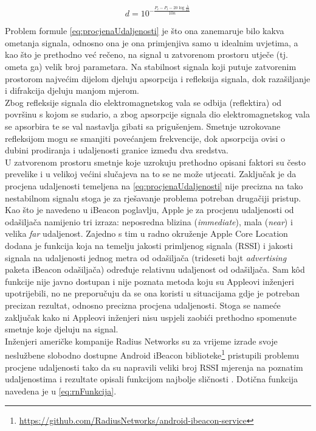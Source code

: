 \begin{equation}
	\label{eq:procjenaUdaljenosti}
	d = 10^{-\frac{P_r - P_t - 20\log{\frac{\lambda}{4\pi}}}{10n}}
\end{equation}

Problem formule \eqref{eq:procjenaUdaljenosti} je što ona zanemaruje bilo kakva ometanja signala, odnosno ona je ona primjenjiva samo u idealnim uvjetima, a kao što je prethodno već rečeno, na signal u zatvorenom prostoru utječe (tj. ometa ga) velik broj parametara. 
Na stabilnost signala koji putuje zatvorenim prostorom najvećim dijelom djeluju apsorpcija i refleksija signala, dok razašiljanje i difrakcija djeluju manjom mjerom.
\\
Zbog refleksije signala dio elektromagnetskog vala se odbija (reflektira) od površinu s kojom se sudario, a zbog apsorpcije signala dio elektromagnetskog vala se apsorbira te se val nastavlja gibati sa prigušenjem. 
Smetnje uzrokovane refleksijom mogu se smanjiti povećanjem frekvencije, dok apsorpcija ovisi o dubini prodiranja i udaljenosti granice između dva sredstva. 
\\

U zatvorenom prostoru smetnje koje uzrokuju prethodno opisani faktori su često prevelike i u velikoj većini slučajeva na to se ne može utjecati. 
Zaključak je da procjena udaljenosti temeljena na \eqref{eq:procjenaUdaljenosti} nije precizna na tako nestabilnom signalu stoga je za rješavanje problema potreban drugačiji pristup.
\\

Kao što je navedeno u iBeacon poglavlju, Apple je za procjenu udaljenosti od odašiljača namijenio tri izraza: neposredna blizina (\textit{immediate}), mala (\textit{near}) i velika \textit{far} udaljenost.
Zajedno s tim u radno okruženje Apple Core Location dodana je funkcija koja na temelju jakosti primljenog signala (RSSI) i jakosti signala na udaljenosti jednog metra od odašiljača (trideseti bajt \textit{advertising} paketa iBeacon odašiljača) određuje relativnu udaljenost od odašiljača. 
Sam kôd funkcije nije javno dostupan i nije poznata metoda koju su Appleovi inženjeri upotrijebili, no ne preporučuju da se ona koristi u situacijama gdje je potreban precizan rezultat, odnosno precizna procjena udaljenosti. 
Stoga se nameće zaključak kako ni Appleovi inženjeri nisu uspjeli zaobići prethodno spomenute smetnje koje djeluju na signal.
\\

Inženjeri američke kompanije Radius Networks su za vrijeme izrade svoje neslužbene slobodno dostupne Android iBeacon biblioteke\footnote{\url{https://github.com/RadiusNetworks/android-ibeacon-service}} pristupili problemu procjene udaljenosti tako da su napravili veliki broj RSSI mjerenja na poznatim udaljenostima i rezultate opisali funkcijom najbolje sličnosti \citep{stackoverflowRadiusDistancing}. 
Dotična funkcija navedena je u \eqref{eq:rnFunkcija}.

